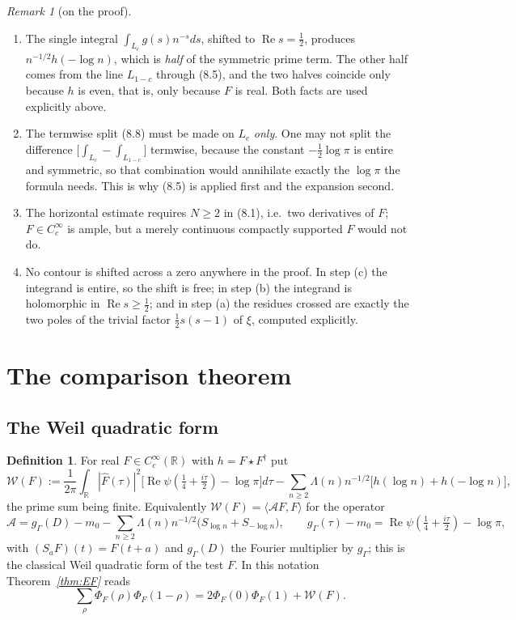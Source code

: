 \documentclass[11pt]{amsart}
\theoremstyle{definition}
\newtheorem{definition}[theorem]{Definition}
\theoremstyle{remark}
\newtheorem{remark}[theorem]{Remark}
\newcommand{\R}{\mathbb R}
\newcommand{\Rel}{\operatorname{Re}}
\begin{document}
\begin{remark}[on the proof]
\label{rem:route}
\begin{enumerate}
\item[(1)] The single integral $\int_{L_c}g(s)n^{-s}ds$, shifted to
$\Rel s=\tfrac12$, produces $n^{-1/2}h(-\log n)$, which is \emph{half} of the
symmetric prime term.  The other half comes from the line $L_{1-c}$ through
(8.5), and the two halves coincide only because $h$ is even, that is, only
because $F$ is real.  Both facts are used explicitly above.
\item[(2)] The termwise split (8.8) must be made on $L_c$ \emph{only}.  One may
not split the difference $\bigl[\int_{L_c}-\int_{L_{1-c}}\bigr]$ termwise,
because the constant $-\tfrac12\log\pi$ is entire and symmetric, so that
combination would annihilate exactly the $\log\pi$ the formula needs.  This is
why (8.5) is applied first and the expansion second.
\item[(3)] The horizontal estimate requires $N\ge2$ in (8.1), i.e.\ two
derivatives of $F$; $F\in C_c^\infty$ is ample, but a merely continuous
compactly supported $F$ would not do.
\item[(4)] No contour is shifted across a zero anywhere in the proof.  In
step (c) the integrand is entire, so the shift is free; in step (b) the
integrand is holomorphic in $\Rel s\ge\tfrac12$; and in step (a) the residues
crossed are exactly the two poles of the trivial factor $\tfrac12s(s-1)$ of
$\xi$, computed explicitly.
\end{enumerate}
\end{remark}

\section{The comparison theorem}
\label{sec:comparison}

\subsection{The Weil quadratic form}

\begin{definition}
\label{def:weilform}
For real $F\in C_c^\infty(\R)$ with $h=F\star F^\dagger$ put
\begin{equation}
  \mathcal W(F):=\frac1{2\pi}\int_\R|\hat F(\tau)|^2
     \bigl[\Rel\psi(\tfrac14+\tfrac{i\tau}2)-\log\pi\bigr]d\tau
   -\sum_{n\ge2}\Lambda(n)n^{-1/2}\bigl[h(\log n)+h(-\log n)\bigr],
\tag{9.1}
\end{equation}
the prime sum being finite.  Equivalently
$\mathcal W(F)=\langle\mathcal AF,F\rangle$ for the operator
\[
  \mathcal A=g_\Gamma(D)-m_0-\sum_{n\ge2}\Lambda(n)n^{-1/2}
   \bigl(S_{\log n}+S_{-\log n}\bigr),
  \qquad g_\Gamma(\tau)-m_0=\Rel\psi(\tfrac14+\tfrac{i\tau}2)-\log\pi ,
\]
with $(S_aF)(t)=F(t+a)$ and $g_\Gamma(D)$ the Fourier multiplier by
$g_\Gamma$; this is the classical Weil quadratic form of the test $F$.  In this
notation Theorem~\emph{\ref{thm:EF}} reads
\begin{equation}
  \sum_\rho\Phi_F(\rho)\Phi_F(1-\rho)=2\Phi_F(0)\Phi_F(1)+\mathcal W(F).
\tag{9.2}
\end{equation}
\end{definition}
\end{document}
